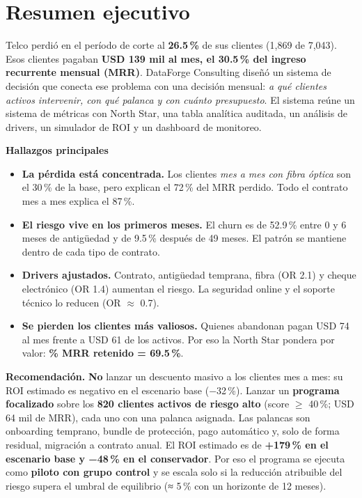 \documentclass[10.5pt,a4paper]{article}
\begin{document}
\section{Resumen ejecutivo}
Telco perdió en el período de corte al \textbf{26.5\,\%} de sus clientes (1,869 de 7,043). Esos clientes pagaban \textbf{USD 139 mil al mes, el 30.5\,\% del ingreso recurrente mensual (MRR)}. DataForge Consulting diseñó un sistema de decisión que conecta ese problema con una decisión mensual: \emph{a qué clientes activos intervenir, con qué palanca y con cuánto presupuesto}. El sistema reúne un sistema de métricas con North Star, una tabla analítica auditada, un análisis de drivers, un simulador de ROI y un dashboard de monitoreo.

\textbf{Hallazgos principales}
\begin{itemize}
  \item \textbf{La pérdida está concentrada.} Los clientes \emph{mes a mes con fibra óptica} son el 30\,\% de la base, pero explican el 72\,\% del MRR perdido. Todo el contrato mes a mes explica el 87\,\%.
  \item \textbf{El riesgo vive en los primeros meses.} El churn es de 52.9\,\% entre 0 y 6 meses de antigüedad y de 9.5\,\% después de 49 meses. El patrón se mantiene dentro de cada tipo de contrato.
  \item \textbf{Drivers ajustados.} Contrato, antigüedad temprana, fibra (OR 2.1) y cheque electrónico (OR 1.4) aumentan el riesgo. La seguridad online y el soporte técnico lo reducen (OR $\approx$ 0.7).
  \item \textbf{Se pierden los clientes más valiosos.} Quienes abandonan pagan USD 74 al mes frente a USD 61 de los activos. Por eso la North Star pondera por valor: \textbf{\% MRR retenido = 69.5\,\%}.
\end{itemize}

\begin{caja}
\textbf{Recomendación.} \textbf{No} lanzar un descuento masivo a los clientes mes a mes: su ROI estimado es negativo en el escenario base (−32\,\%). Lanzar un \textbf{programa focalizado} sobre los \textbf{820 clientes activos de riesgo alto} (score $\geq$ 40\,\%; USD 64 mil de MRR), cada uno con una palanca asignada. Las palancas son onboarding temprano, bundle de protección, pago automático y, solo de forma residual, migración a contrato anual. El ROI estimado es de \textbf{+179\,\% en el escenario base y −48\,\% en el conservador}. Por eso el programa se ejecuta como \textbf{piloto con grupo control} y se escala solo si la reducción atribuible del riesgo supera el umbral de equilibrio (≈ 5\,\% con un horizonte de 12 meses).
\end{caja}
\end{document}
